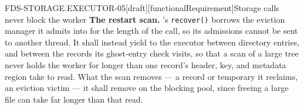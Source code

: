 \begin{requirement}{FDS-STORAGE.EXECUTOR-05}[draft][functionalRequirement]{Storage calls never block the worker}
  \textbf{The restart scan.} 's
  \texttt{recover()} borrows the eviction manager it admits into for the
  length of the call, so its admissions cannot be sent to another thread.
  It shall instead yield to the executor between directory entries, and
  between the records its ghost-entry check visits, so that a scan of a large
  tree never holds the worker for longer than one record's header, key, and
  metadata region take to read. What the scan removes --- a
  record or temporary it reclaims, an eviction victim --- it shall remove on
  the blocking pool, since freeing a large file can take far longer than
  that read.



\end{requirement}

